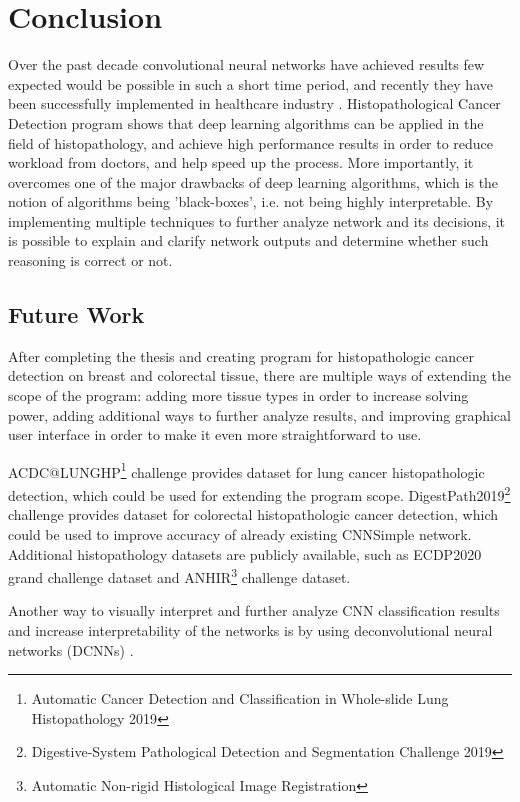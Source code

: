 \chapter{Conclusion}
\label{ch:sum}

Over the past decade convolutional neural networks have achieved results few expected would be possible in such a short time period, and recently they have been successfully implemented in healthcare industry \cite{miotto2018deep}. Histopathological Cancer Detection program shows that deep learning algorithms can be applied in the field of histopathology, and achieve high performance results in order to reduce workload from doctors, and help speed up the process. More importantly, it overcomes one of the major drawbacks of deep learning algorithms, which is the notion of algorithms being 'black-boxes', i.e. not being highly interpretable. By implementing multiple techniques to further analyze network and its decisions, it is possible to explain and clarify network outputs and determine whether such reasoning is correct or not.

\section{Future Work}

After completing the thesis and creating program for histopathologic cancer detection on breast and colorectal tissue, there are multiple ways of extending the scope of the program: adding more tissue types in order to increase solving power, adding additional ways to further analyze results, and improving graphical user interface in order to make it even more straightforward to use.

ACDC@LUNGHP\footnote{Automatic Cancer Detection and Classification in Whole-slide Lung Histopathology 2019} challenge provides dataset for lung cancer histopathologic detection, which could be used for extending the program scope. DigestPath2019\footnote{Digestive-System Pathological Detection and Segmentation Challenge 2019} challenge provides dataset for colorectal histopathologic cancer detection, which could be used to improve accuracy of already existing CNNSimple network. Additional histopathology datasets are publicly available, such as ECDP2020 grand challenge dataset and ANHIR\footnote{ Automatic Non-rigid Histological Image Registration} challenge dataset.

Another way to visually interpret and further analyze CNN classification results and increase interpretability of the networks is by using deconvolutional neural networks (DCNNs) \cite{zeiler2011adaptive}.